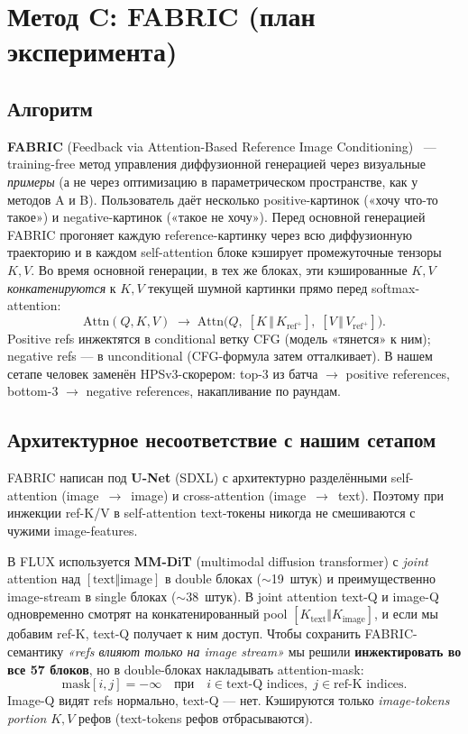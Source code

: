 \documentclass[11pt,a4paper]{article}
\begin{document}
\section{Метод C: FABRIC (план эксперимента)}

\subsection{Алгоритм}

\textbf{FABRIC} (Feedback via Attention-Based Reference Image
Conditioning)~\cite{rerich2023fabric} --- training-free метод управления
диффузионной генерацией через визуальные \emph{примеры} (а не через
оптимизацию в параметрическом пространстве, как у методов A и B).
Пользователь даёт несколько positive-картинок («хочу что-то такое») и
negative-картинок («такое не хочу»). Перед основной генерацией FABRIC
прогоняет каждую reference-картинку через всю диффузионную траекторию и в
каждом self-attention блоке кэширует промежуточные тензоры $K, V$. Во
время основной генерации, в тех же блоках, эти кэшированные $K, V$
\emph{конкатенируются} к $K, V$ текущей шумной картинки прямо перед
softmax-attention:
\[
\text{Attn}(Q, K, V) \;\to\;
\text{Attn}\bigl(Q,\; [K \,\Vert\, K_{\text{ref}^+}],\;
                       [V \,\Vert\, V_{\text{ref}^+}]\bigr).
\]
Positive refs инжектятся в conditional ветку CFG (модель «тянется» к
ним); negative refs --- в unconditional (CFG-формула затем отталкивает).
В нашем сетапе человек заменён HPSv3-скорером: top-$3$ из батча $\to$
positive references, bottom-$3$ $\to$ negative references, накапливание
по раундам.

\subsection{Архитектурное несоответствие с нашим сетапом}

FABRIC написан под \textbf{U-Net} (SDXL) с архитектурно разделёнными
self-attention (image~$\to$~image) и cross-attention (image~$\to$~text).
Поэтому при инжекции ref-K/V в self-attention text-токены никогда не
смешиваются с чужими image-features.

В FLUX используется \textbf{MM-DiT} (multimodal diffusion transformer)
с \emph{joint} attention над $[\text{text}\Vert\text{image}]$ в double
блоках ($\sim$19~штук) и преимущественно image-stream в single блоках
($\sim$38~штук). В joint attention text-Q и image-Q одновременно смотрят
на конкатенированный pool $[K_{\text{text}} \Vert K_{\text{image}}]$, и
если мы добавим ref-K, text-Q получает к ним доступ. Чтобы сохранить
FABRIC-семантику \emph{«refs влияют только на image stream»} мы решили
\textbf{инжектировать во все 57 блоков}, но в double-блоках накладывать
attention-mask:
\[
\text{mask}[i, j] = -\infty \quad \text{при} \quad i \in \text{text-Q indices},
\; j \in \text{ref-K indices.}
\]
Image-Q видят refs нормально, text-Q --- нет. Кэшируются только
\emph{image-tokens portion} $K, V$ рефов (text-tokens рефов отбрасываются).
\end{document}
